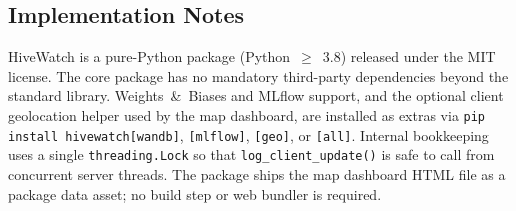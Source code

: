 \subsection{Implementation Notes}

HiveWatch is a pure-Python package (Python~$\geq$~3.8) released under the MIT license. The core package has no mandatory third-party dependencies beyond the standard library. Weights~\&~Biases and MLflow support, and the optional client geolocation helper used by the map dashboard, are installed as extras via \texttt{pip install hivewatch[wandb]}, \texttt{[mlflow]}, \texttt{[geo]}, or \texttt{[all]}. Internal bookkeeping uses a single \texttt{threading.Lock} so that \texttt{log\_client\_update()} is safe to call from concurrent server threads. The package ships the map dashboard HTML file as a package data asset; no build step or web bundler is required.
